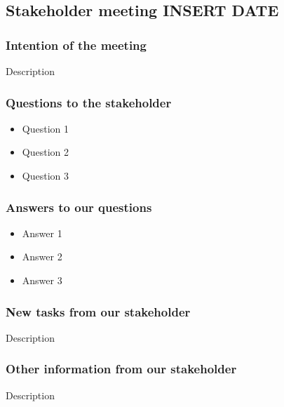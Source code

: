 \begin{center}
\subsection*{Stakeholder meeting INSERT DATE}
\end{center}

\bigskip


\subsubsection*{Intention of the meeting}
Description


\subsubsection*{Questions to the stakeholder}
\begin{itemize}
    \item Question 1
    \item Question 2
    \item Question 3
\end{itemize}


\subsubsection*{Answers to our questions}
\begin{itemize}
    \item Answer 1
    \item Answer 2
    \item Answer 3
\end{itemize}


\subsubsection*{New tasks from our stakeholder}
Description

\subsubsection*{Other information from our stakeholder}
Description

\newpage
